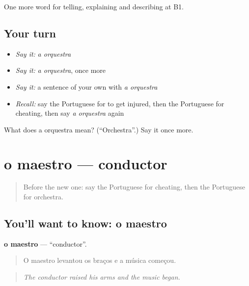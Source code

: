 \begin{grammarlens}[title={What you've built}]
One more word for telling, explaining and describing at B1.
\end{grammarlens}

\subsection*{Your turn}
\begin{itemize}
\raggedright
  \item \emph{Say it:} \emph{a orquestra}
  \item \emph{Say it:} \emph{a orquestra}, once more
  \item \emph{Say it:} a sentence of your own with \emph{a orquestra}
  \item \emph{Recall:} say the Portuguese for to get injured, then the Portuguese for cheating, then say \emph{a orquestra} again
\end{itemize}

\begin{tcolorbox}[breakable,colback=teal!4,colframe=teal!35!black,title={Before you move on}]
What does a orquestra mean? (\textquotedblleft{}Orchestra\textquotedblright{}.) Say it once more.
\end{tcolorbox}
\section[o maestro]{o maestro — conductor}

\label{lesson:PT-C516-maestro}



\begin{quote}
Before the new one: say the Portuguese for cheating, then the Portuguese for orchestra.
\end{quote}

\subsection*{You'll want to know: o maestro}
\textbf{o maestro} — \textquotedblleft{}conductor\textquotedblright{}.

\begin{quote}
O maestro levantou os braços e a música começou.
\end{quote}

\begin{quote}
\emph{The conductor raised his arms and the music began.}
\end{quote}

